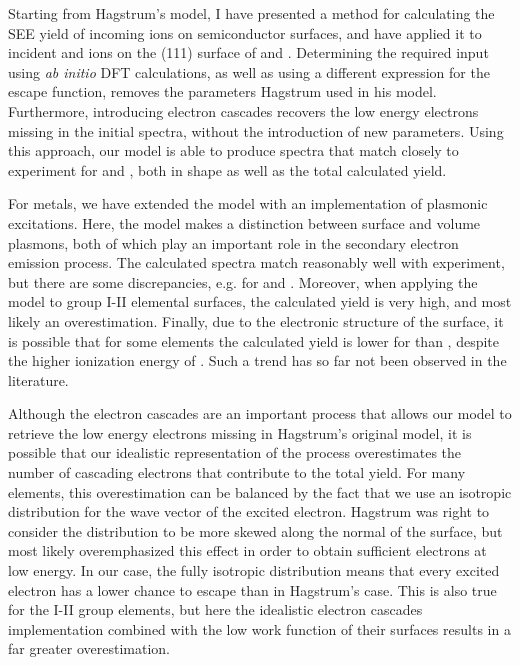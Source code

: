 \begin{refsection}
Starting from Hagstrum's model, I have presented a method for calculating the 
SEE yield of incoming ions on semiconductor surfaces, and have applied it to 
incident  and  ions on the (111) surface of  and 
. Determining the required input using \textit{ab initio} \gls{DFT} 
calculations, as well as using a different expression for the escape function, 
removes the parameters Hagstrum used in his model. Furthermore, introducing 
electron cascades recovers the low energy electrons missing in the initial spectra,
without the introduction of new parameters. Using this approach, our model is 
able to produce spectra that match closely to experiment for  and 
, both in shape as well as the total calculated yield.

For metals, we have extended the model with an implementation of plasmonic 
excitations. Here, the model makes a distinction between surface and volume 
plasmons, both of which play an important role in the secondary electron emission 
process. The calculated spectra match reasonably well with experiment, but there 
are some discrepancies, e.g. for  and . Moreover, when applying the 
model to group I-II elemental surfaces, the calculated yield is very high, and 
most likely an overestimation. Finally, due to the electronic structure of the 
surface, it is possible that for some elements the calculated yield is lower 
for  than , despite the higher ionization energy of . Such 
a trend has so far not been observed in the literature.

Although the electron cascades are an important process that allows our model
to retrieve the low energy electrons missing in Hagstrum's original model, it 
is possible that our idealistic representation of the process overestimates 
the number of cascading electrons that contribute to the total yield. For many 
elements, this overestimation can be balanced by the fact that we use an isotropic 
distribution for the wave vector of the excited electron. Hagstrum was right to
consider the distribution to be more skewed along the normal of the surface, but 
most likely overemphasized this effect in order to obtain sufficient electrons
at low energy. In our case, the fully isotropic distribution means that every 
excited electron has a lower chance to escape than in Hagstrum's case. This is
also true for the I-II group elements, but here the idealistic electron cascades 
implementation combined with the low work function of their surfaces 
results in a far greater overestimation.


\end{refsection}
